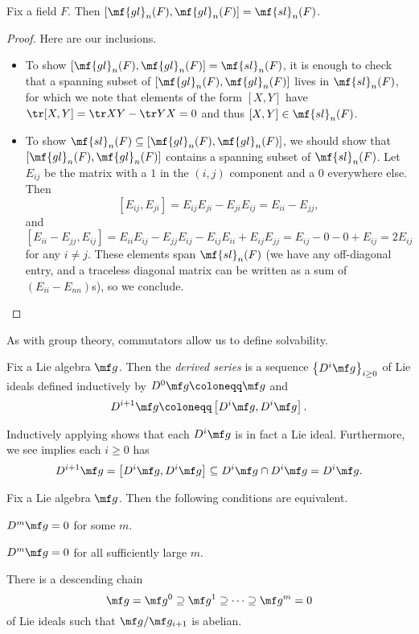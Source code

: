 \documentclass[../notes.tex]{subfiles}
\begin{document}
\begin{exe}
	Fix a field $F$. Then $[\mf{gl}_n(F),\mf{gl}_n(F)]=\mf{sl}_n(F)$.
\end{exe}
\begin{proof}
	Here are our inclusions.
	\begin{itemize}
		\item To show $[\mf{gl}_n(F),\mf{gl}_n(F)]=\mf{sl}_n(F)$, it is enough to check that a spanning subset of $[\mf{gl}_n(F),\mf{gl}_n(F)]$ lives in $\mf{sl}_n(F)$, for which we note that elements of the form $[X,Y]$ have $\tr[X,Y]=\tr XY-\tr YX=0$ and thus $[X,Y]\in\mf{sl}_n(F)$.
		\item To show $\mf{sl}_n(F)\subseteq[\mf{gl}_n(F),\mf{gl}_n(F)]$, we should show that $[\mf{gl}_n(F),\mf{gl}_n(F)]$ contains a spanning subset of $\mf{sl}_n(F)$. Let $E_{ij}$ be the matrix with a $1$ in the $(i,j)$ component and a $0$ everywhere else. Then
		\[[E_{ij},E_{ji}]=E_{ij}E_{ji}-E_{ji}E_{ij}=E_{ii}-E_{jj},\]
		and
		\[[E_{ii}-E_{jj},E_{ij}]=E_{ii}E_{ij}-E_{jj}E_{ij}-E_{ij}E_{ii}+E_{ij}E_{jj}=E_{ij}-0-0+E_{ij}=2E_{ij}\]
		for any $i\ne j$. These elements span $\mf{sl}_n(F)$ (we have any off-diagonal entry, and a traceless diagonal matrix can be written as a sum of $(E_{ii}-E_{nn})$s), so we conclude.
		\qedhere
	\end{itemize}
\end{proof}
As with group theory, commutators allow us to define solvability.
\begin{definition}
	Fix a Lie algebra $\mf g$. Then the \textit{derived series} is a sequence $\left\{D^i\mf g\right\}_{i\ge0}$ of Lie ideals defined inductively by $D^0\mf g\coloneqq\mf g$ and
	\[D^{i+1}\mf g\coloneqq\left[D^i\mf g,D^i\mf g\right].\]
\end{definition}
\begin{remark} \label{rem:derived-series-descends}
	Inductively applying  shows that each $D^i\mf g$ is in fact a Lie ideal. Furthermore, we see  implies each $i\ge0$ has
	\[D^{i+1}\mf g=\left[D^i\mf g,D^i\mf g\right]\subseteq D^i\mf g\cap D^i\mf g=D^i\mf g.\]
\end{remark}
\begin{lemma}
	Fix a Lie algebra $\mf g$. Then the following conditions are equivalent.
	\begin{listalph}
		\item $D^m\mf g=0$ for some $m$.
		\item $D^m\mf g=0$ for all sufficiently large $m$.
		\item There is a descending chain
		\[\mf g=\mf g^0\supseteq\mf g^1\supseteq\cdots\supseteq\mf g^m=0\]
		of Lie ideals such that $\mf g/\mf g_{i+1}$ is abelian.
	\end{listalph}
\end{lemma}
\end{document}
